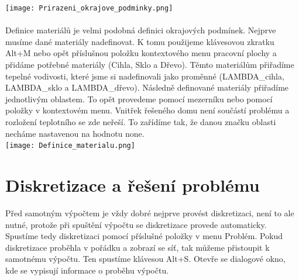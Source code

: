 \documentclass[a4paper, oneside]{article}
\begin{document}
\texttt{[image: Prirazeni\_okrajove\_podminky.png]}\\
\\
\indent Definice materiálů je velmi podobná definici okrajových podmínek. Nejprve musíme dané materiály nadefinovat. K tomu použijeme klávesovou zkratku Alt+M nebo opět příslušnou položku kontextového menu pracovní plochy a přidáme potřebné materiály (Cihla, Sklo a Dřevo). Těmto materiálům přiřadíme tepelné vodivosti, které jsme si nadefinovali jako proměnné (LAMBDA\_cihla, LAMBDA\_sklo a LAMBDA\_dřevo). Následně definované materiály přiřadíme jednotlivým oblastem. To opět provedeme pomocí mezerníku nebo pomocí položky v kontextovém menu. Vnitřek řešeného domu není součástí problému a rozložení teplotního se zde neřeší. To zařídíme tak, že danou značku oblasti necháme nastavenou na hodnotu none.\\
\texttt{[image: Definice\_materialu.png]}\\
\section{Diskretizace a řešení problému}
\indent Před samotným výpočtem je vždy dobré nejprve provést diskretizaci, není to ale nutné, protože při spuštění výpočtu se diskretizace provede automaticky. Spustíme tedy diskretizaci pomocí příslušné položky v menu Problém. Pokud diskretizace proběhla v pořádku a zobrazí se síť, tak můžeme přistoupit k samotnému výpočtu. Ten spustíme klávesou Alt+S. Otevře se dialogové okno, kde se vypisují informace o proběhu výpočtu.\\
\end{document}
